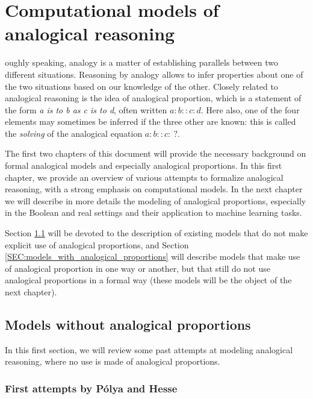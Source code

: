 \chapter{Computational models of analogical reasoning}
\label{CHAP:computational_models_of_analogical_reasoning}
\renewcommand{\contentsname}{Content}
\localtableofcontents*
\vspace*{\baselineskip}

oughly speaking, analogy is a matter of establishing parallels
between two different situations. Reasoning by analogy allows to infer
properties about one of the two situations based on our knowledge of the other.
Closely related to analogical reasoning is the idea of analogical proportion,
which is a statement of the form \textit{a is to b as c is to d}, often written
$a:b::c:d$. Here also, one of the four elements may sometimes be inferred if
the three other are known: this is called the \textit{solving} of the
analogical equation $a:b::c:~?$.

The first two chapters of this document will provide the necessary background
on formal analogical models and especially analogical proportions. In this
first chapter, we provide an overview of various attempts to formalize
analogical reasoning, with a strong emphasis on computational models. In the
next chapter we will describe in more details the modeling of analogical
proportions, especially in the Boolean and real settings and their application
to machine learning tasks.

Section \ref{SEC:models_without_proportions} will be devoted to the description
of existing models that do not make explicit use of analogical proportions, and
Section \ref{SEC:models_with_analogical_proportions} will describe models that
make use of analogical proportion in one way or another, but that still do not
use analogical proportions in a formal way (these models will be the object of
the next chapter).

\section{Models without analogical proportions}
\label{SEC:models_without_proportions}

In this first section, we will review some past attempts at modeling analogical
reasoning, where no use is made of analogical proportions.

\subsection{First attempts by P\'olya and Hesse}

